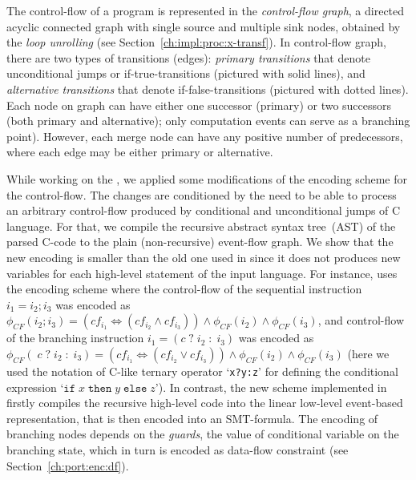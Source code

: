 The control-flow of a program is represented in the \textit{control-flow graph}, a directed acyclic connected graph with single source and multiple sink nodes, obtained by the \textit{loop unrolling} (see Section~\ref{ch:impl:proc:x-transf}).%
In control-flow graph, there are two types of transitions (edges): \textit{primary transitions} that denote unconditional jumps or if-true-transitions (pictured with solid lines), and \textit{alternative transitions} that denote if-false-transitions (pictured with dotted lines). Each node on graph can have either one successor (primary) or two successors (both primary and alternative); only computation events can serve as a branching point). However, each merge node can have any positive number of predecessors, where each edge may be either primary or alternative.

While working on the \porthos[2], we applied some modifications of the encoding scheme for the control-flow. The changes are conditioned by the need to be able to process an arbitrary control-flow produced by conditional and unconditional jumps of C language.
For that, we compile the recursive abstract syntax tree~(AST) of the parsed C-code to the plain (non-recursive) event-flow graph.
We show %
that the new encoding is smaller than the old one used in \porthos{} since it does not produces new variables for each high-level statement of the input language.
For instance, \porthos{} uses the encoding scheme where the control-flow of the sequential instruction $i_1 = i_2; i_3$ was encoded as
$\phi_{CF}(i_2;i_3) = (cf_{i_1} \Leftrightarrow (cf_{i_2} \land cf_{i_3})) \land \phi_{CF}(i_2) \land \phi_{CF}(i_3)$,
and control-flow of the branching instruction $i_1 = (c \; ? \; i_2 \; : \; i_3)$ was encoded as
$\phi_{CF}( \; c \; ? \; i_2 \; : \; i_3) = (cf_{i_1} \Leftrightarrow (cf_{i_2} \lor cf_{i_3})) \land \phi_{CF}(i_2) \land \phi_{CF}(i_3)$
(here we used the notation of C-like ternary operator `\texttt{x?y:z}' for defining the conditional expression `$\mathtt{if}\;x\;\mathtt{then}\;y\;\mathtt{else}\;z$').
In contrast, the new scheme implemented in \porthos[2] firstly compiles the recursive high-level code into the linear low-level event-based representation, that is then encoded into an SMT-formula. The encoding of branching nodes depends on the \textit{guards}, the value of conditional variable on the branching state, which in turn is encoded as data-flow constraint (see Section~\ref{ch:port:enc:df}).

